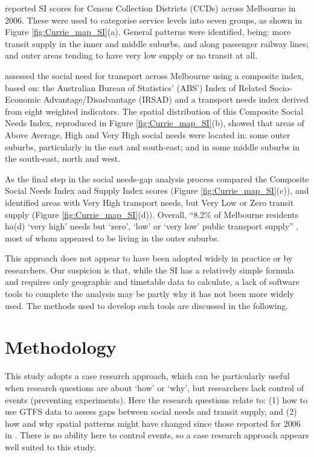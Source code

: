 \documentclass[preprint, 3p,
authoryear]{elsarticle} %
\begin{document}
\citet{currie2010identifying} reported SI scores for Census Collection
Districts (CCDs) across Melbourne in 2006. These were used to categorise
service levels into seven groups, as shown in Figure
\ref{fig:Currie_map_SI}(a). General patterns were identified, being:
more transit supply in the inner and middle suburbs, and along passenger
railway lines; and outer areas tending to have very low supply or no
transit at all.

\citet{currie2010identifying} assessed the social need for transport
across Melbourne using a composite index, based on: the Australian
Bureau of Statistics' (ABS') Index of Related Socio-Economic
Advantage/Disadvantage (IRSAD) and a transport needs index derived from
eight weighted indicators. The spatial distribution of this Composite
Social Needs Index, reproduced in Figure \ref{fig:Currie_map_SI}(b),
showed that areas of Above Average, High and Very High social needs were
located in: some outer suburbs, particularly in the east and south-east;
and in some middle suburbs in the south-east, north and west.

As the final step in the social needs-gap analysis process
\citet{currie2010identifying} compared the Composite Social Needs Index
and Supply Index scores (Figure \ref{fig:Currie_map_SI}(c)), and
identified areas with Very High transport needs, but Very Low or Zero
transit supply (Figure \ref{fig:Currie_map_SI}(d)). Overall, ``8.2\% of
Melbourne residents ha(d) `very high' needs but `zero', `low' or `very
low' public transport supply'' \citep{currie2010identifying}, most of
whom appeared to be living in the outer suburbs.

This approach does not appear to have been adopted widely in practice or
by researchers. Our suspicion is that, while the SI has a relatively
simple formula and requires only geographic and timetable data to
calculate, a lack of software tools to complete the analysis may be
partly why it has not been more widely used. The methods used to develop
such tools are discussed in the following.

\section{Methodology}\label{methodology}

This study adopts a case research approach, which can be particularly
useful when research questions are about `how' or `why', but researchers
lack control of events (preventing experiments)\citep{Yin2009aa}. Here
the research questions relate to: (1) how to use GTFS data to assess
gaps between social needs and transit supply, and (2) how and why
spatial patterns might have changed since those reported for 2006 in
\citet{currie2010identifying}. There is no ability here to control
events, so a case research approach appears well suited to this study.
\end{document}
